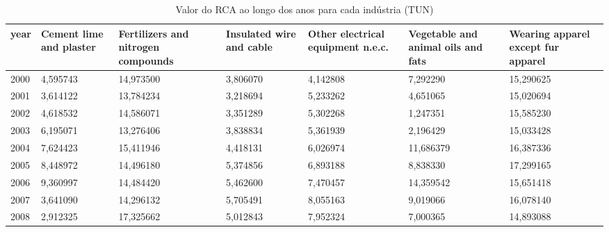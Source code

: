 \begin{table}
\centering
\caption{Valor do RCA ao longo dos anos para cada indústria (TUN)}
\begin{tabular}{p{1cm}p{2cm}p{2cm}p{2cm}p{2cm}p{2cm}p{2cm}}
\toprule
 year &  Cement lime and plaster &  Fertilizers and nitrogen compounds &  Insulated wire and cable &  Other electrical equipment n.e.c. &  Vegetable and animal oils and fats &  Wearing apparel except fur apparel \\
\midrule
 2000 &                 4,595743 &                           14,973500 &                  3,806070 &                           4,142808 &                            7,292290 &                           15,290625 \\
 2001 &                 3,614122 &                           13,784234 &                  3,218694 &                           5,233262 &                            4,651065 &                           15,020694 \\
 2002 &                 4,618532 &                           14,586071 &                  3,351289 &                           5,302268 &                            1,247351 &                           15,585230 \\
 2003 &                 6,195071 &                           13,276406 &                  3,838834 &                           5,361939 &                            2,196429 &                           15,033428 \\
 2004 &                 7,624423 &                           15,411946 &                  4,418131 &                           6,026974 &                           11,686379 &                           16,387336 \\
 2005 &                 8,448972 &                           14,496180 &                  5,374856 &                           6,893188 &                            8,838330 &                           17,299165 \\
 2006 &                 9,360997 &                           14,484420 &                  5,462600 &                           7,470457 &                           14,359542 &                           15,651418 \\
 2007 &                 3,641090 &                           14,296132 &                  5,705491 &                           8,055163 &                            9,019066 &                           16,078140 \\
 2008 &                 2,912325 &                           17,325662 &                  5,012843 &                           7,952324 &                            7,000365 &                           14,893088 \\

\end{tabular}
\end{table}
